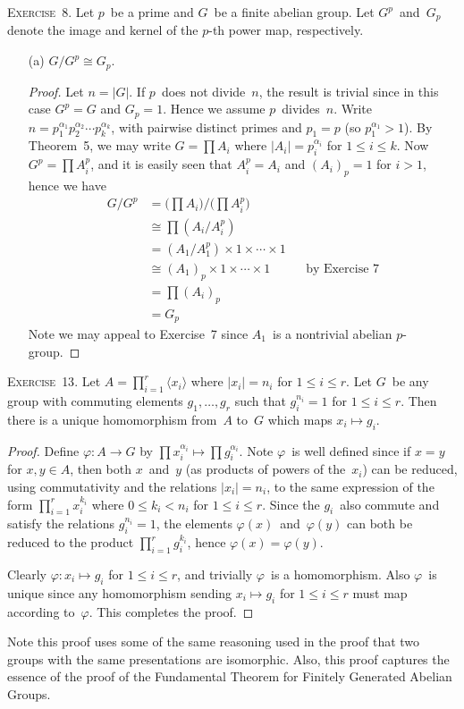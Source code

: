 \documentclass[letterpaper]{article}
\newcommand{\exercise}[1]{\goodbreak\noindent\textsc{Exercise~{#1}.}}
\newcommand{\iso}{\cong}
\newcommand{\ord}[1]{|{#1}|}
\newcommand{\gen}[1]{\langle{#1}\rangle}
\begin{document}
\exercise{8}
Let $p$~be a prime and $G$~be a finite abelian group. Let $G^p$~and~$G_p$ denote the image and kernel of the $p$-th power map, respectively.
\begin{enumerate}[itemsep=0pt]
\item[(a)] $G/G^p\iso G_p$.
\begin{proof}
Let $n=\ord{G}$. If $p$~does not divide~$n$, the result is trivial since in this case $G^p=G$ and $G_p=1$. Hence we assume $p$~divides~$n$. Write $n=p_1^{\alpha_1}p_2^{\alpha_2}\cdots p_k^{\alpha_k}$, with pairwise distinct primes and $p_1=p$ (so $p_1^{\alpha_1}>1$). By Theorem~5, we may write $G=\prod A_i$ where $\ord{A_i}=p_i^{\alpha_i}$ for $1\le i\le k$. Now $G^p=\prod A_i^p$, and it is easily seen that $A_i^p=A_i$ and $(A_i)_p=1$ for $i>1$, hence we have
\begin{align*}
G/G^p&=\bigl(\prod A_i\bigr)/\bigl(\prod A_i^p\bigr)&&\\
	&\iso\prod(A_i/A_i^p)&&\\
	&=(A_1/A_1^p)\times1\times\cdots\times1&&\\
	&\iso (A_1)_p\times1\times\cdots\times1&&\text{by Exercise 7}\\
	&=\prod(A_i)_p&&\\
	&=G_p
\end{align*}
Note we may appeal to Exercise~7 since $A_1$~is a nontrivial abelian $p$-group.
\end{proof}
\end{enumerate}

\exercise{13}
Let $A=\prod_{i=1}^r\gen{x_i}$ where $\ord{x_i}=n_i$ for $1\le i\le r$. Let $G$~be any group with commuting elements $g_1,\ldots,g_r$ such that $g_i^{n_i}=1$ for $1\le i\le r$. Then there is a unique homomorphism from~$A$ to~$G$ which maps $x_i\mapsto g_i$.
\begin{proof}
Define $\varphi:A\to G$ by $\prod x_i^{\alpha_i}\mapsto\prod g_i^{\alpha_i}$. Note $\varphi$~is well defined since if $x=y$ for $x,y\in A$, then both $x$~and~$y$ (as products of powers of the~$x_i$) can be reduced, using commutativity and the relations $\ord{x_i}=n_i$, to the same expression of the form $\prod_{i=1}^r x_i^{k_i}$ where $0\le k_i<n_i$ for $1\le i\le r$. Since the $g_i$~also commute and satisfy the relations $g_i^{n_i}=1$, the elements $\varphi(x)$~and~$\varphi(y)$ can both be reduced to the product $\prod_{i=1}^r g_i^{k_i}$, hence $\varphi(x)=\varphi(y)$.

Clearly $\varphi:x_i\mapsto g_i$ for $1\le i\le r$, and trivially $\varphi$~is a homomorphism. Also $\varphi$~is unique since any homomorphism sending $x_i\mapsto g_i$ for $1\le i\le r$ must map according to~$\varphi$. This completes the proof.
\end{proof}
\noindent Note this proof uses some of the same reasoning used in the proof that two groups with the same presentations are isomorphic. Also, this proof captures the essence of the proof of the Fundamental Theorem for Finitely Generated Abelian Groups.
\end{document}
